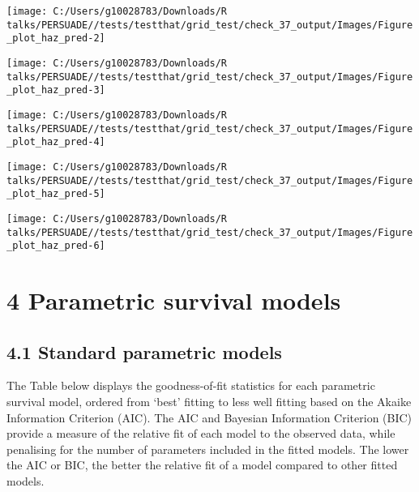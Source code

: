 \documentclass[
]{article}
\begin{document}
\begin{flushleft}\texttt{[image: C:/Users/g10028783/Downloads/R talks/PERSUADE//tests/testthat/grid\_test/check\_37\_output/Images/Figure\_plot\_haz\_pred-2]} \end{flushleft}

\begin{flushleft}\texttt{[image: C:/Users/g10028783/Downloads/R talks/PERSUADE//tests/testthat/grid\_test/check\_37\_output/Images/Figure\_plot\_haz\_pred-3]} \end{flushleft}

\begin{flushleft}\texttt{[image: C:/Users/g10028783/Downloads/R talks/PERSUADE//tests/testthat/grid\_test/check\_37\_output/Images/Figure\_plot\_haz\_pred-4]} \end{flushleft}

\begin{flushleft}\texttt{[image: C:/Users/g10028783/Downloads/R talks/PERSUADE//tests/testthat/grid\_test/check\_37\_output/Images/Figure\_plot\_haz\_pred-5]} \end{flushleft}

\begin{flushleft}\texttt{[image: C:/Users/g10028783/Downloads/R talks/PERSUADE//tests/testthat/grid\_test/check\_37\_output/Images/Figure\_plot\_haz\_pred-6]} \end{flushleft}

\clearpage

\section{4 Parametric survival models}\label{parametric-survival-models}

\subsection{4.1 Standard parametric
models}\label{standard-parametric-models}

The Table below displays the goodness-of-fit statistics for each
parametric survival model, ordered from `best' fitting to less well
fitting based on the Akaike Information Criterion (AIC). The AIC and
Bayesian Information Criterion (BIC) provide a measure of the relative
fit of each model to the observed data, while penalising for the number
of parameters included in the fitted models. The lower the AIC or BIC,
the better the relative fit of a model compared to other fitted models.
\end{document}
